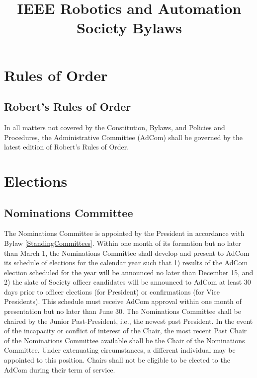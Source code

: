 \documentclass[10pt]{article}
\title{IEEE Robotics and Automation Society Bylaws}
\newcommand{\blref}[1]{Bylaw \ref{#1}}
\begin{document}
\maketitle 

\tableofcontents

\section{Rules of Order}
\subsection{Robert's Rules of Order}

In all matters not covered by the Constitution, Bylaws, and Policies and Procedures, the Administrative Committee (AdCom) shall be governed by the latest edition of Robert's Rules of Order.

\section{Elections}
\subsection{Nominations Committee}
\label{Elections:NominationsCommittee}

The Nominations Committee is appointed by the President in accordance with \blref{StandingCommittees}. Within one month of its formation but no later than March 1, the Nominations Committee shall develop and present to AdCom its schedule of elections for the calendar year such that 1) results of the AdCom election scheduled for the year will be announced no later than December 15, and 2) the slate of Society officer candidates will be announced to AdCom at least 30 days prior to officer elections (for President) or confirmations (for Vice Presidents). This schedule must receive AdCom approval within one month of presentation but no later than June 30. The Nominations Committee shall be chaired by the Junior Past-President, i.e., the newest past President.  In the event of the incapacity or conflict of interest of the Chair, the most recent Past Chair of the Nominations Committee available shall be the Chair of the Nominations Committee.  Under extenuating circumstances, a different individual may be appointed to this position.  Chairs shall not be eligible to be elected to the AdCom during their term of service.
\end{document}
